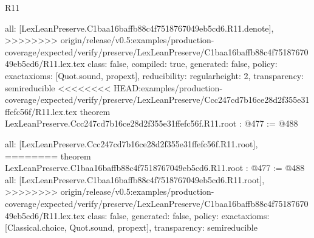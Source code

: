 \begin{lexlean}{R11}
\begin{coremodule}
{{{{{  all: [LexLeanPreserve.C1baa16baffb88c4f7518767049eb5cd6.R11.denote],
>>>>>>>> origin/release/v0.5:examples/production-coverage/expected/verify/preserve/LexLeanPreserve/C1baa16baffb88c4f7518767049eb5cd6/R11.lex.tex
  class: false,
  compiled: true,
  generated: false,
  policy: exact{axioms: [Quot.sound, propext]},
  reducibility: regular{height: 2},
  transparency: semireducible
}
<<<<<<<< HEAD:examples/production-coverage/expected/verify/preserve/LexLeanPreserve/Ccc247cd7b16ce28d2f355e31ffefc56f/R11.lex.tex
theorem LexLeanPreserve.Ccc247cd7b16ce28d2f355e31ffefc56f.R11.root : @477 := @488 {
  all: [LexLeanPreserve.Ccc247cd7b16ce28d2f355e31ffefc56f.R11.root],
========
theorem LexLeanPreserve.C1baa16baffb88c4f7518767049eb5cd6.R11.root : @477 := @488 {
  all: [LexLeanPreserve.C1baa16baffb88c4f7518767049eb5cd6.R11.root],
>>>>>>>> origin/release/v0.5:examples/production-coverage/expected/verify/preserve/LexLeanPreserve/C1baa16baffb88c4f7518767049eb5cd6/R11.lex.tex
  class: false,
  generated: false,
  policy: exact{axioms: [Classical.choice, Quot.sound, propext]},
  transparency: semireducible
}

}}}}}
\end{coremodule}
\end{lexlean}
